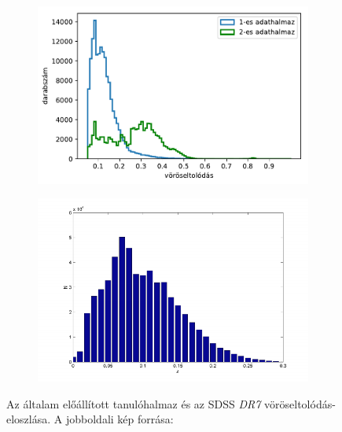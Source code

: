 \documentclass[12pt,letterpaper,oneside,openright]{book}
\begin{document}
 \begin{figure}[h!]
 \centering
  \begin{subfigure}[b]{0.35\textwidth}
    \includegraphics[width=\textwidth, height = \textwidth]{Figures/hists.pdf}
    \label{fig:1}
  \end{subfigure}
  \hspace{2cm}
  \begin{subfigure}[b]{0.35\textwidth}
    \includegraphics[width=\textwidth, height = 1.05\textwidth]{Figures/rsd.png}
    \label{fig:2}
  \end{subfigure}
  \caption{Az általam előállított tanulóhalmaz és az SDSS \textit{DR7} vöröseltolódás-eloszlása. A jobboldali kép forrása: \cite{rsd}}
  \label{fig:dist}
 \end{figure}
\end{document}
